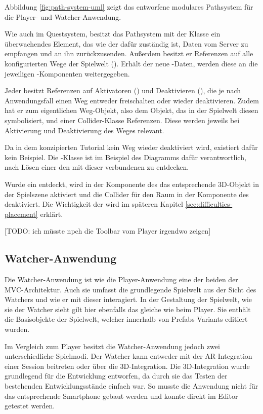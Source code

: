 Abbildung \ref{fig:path-system-uml} zeigt das entworfene modulares Pathsystem für die Player- und Watcher-Anwendung.

Wie auch im Questsystem, besitzt das Pathsystem mit der Klasse  ein überwachendes Element, das wie der  dafür zuständig ist, Daten vom Server zu empfangen und an ihn zurückzusenden. Außerdem besitzt er Referenzen auf alle konfigurierten Wege der Spielwelt (). Erhält der  neue -Daten, werden diese an die jeweiligen -Komponenten weitergegeben.

Jeder  besitzt Referenzen auf Aktivatoren () und Deaktivieren (), die je nach Anwendungsfall einen Weg entweder freischalten oder wieder deaktivieren. Zudem hat er zum eigentlichen Weg-Objekt, also dem Objekt, das in der Spielwelt diesen  symbolisiert, und einer Collider-Klasse Referenzen. Diese werden jeweils bei Aktivierung und Deaktivierung des Weges relevant.

Da in dem konzipierten Tutorial kein Weg wieder deaktiviert wird, existiert dafür kein Beispiel. Die -Klasse ist im Beispiel des Diagramms dafür verantwortlich, nach Lösen einer  den mit dieser  verbundenen  zu entdecken.

Wurde ein  entdeckt, wird in der Komponente des  das entsprechende \ac{3D}-Objekt in der Spielszene aktiviert und die Collider für den Raum in der Komponente des  deaktiviert. Die Wichtigkeit der  wird im späteren Kapitel \ref{sec:difficulties-placement} erklärt. 

[TODO: ich müsste npch die Toolbar vom Player irgendwo zeigen]

\subsection{Watcher-Anwendung}
Die Watcher-Anwendung ist wie die Player-Anwendung eine der beiden  der \ac{MVC}-Architektur. Auch sie umfasst die grundlegende Spielwelt aus der Sicht des Watchers und wie er mit dieser interagiert. In der Gestaltung der Spielwelt, wie sie der Watcher sieht gilt hier ebenfalls das gleiche wie beim Player. Sie enthält die Basisobjekte der Spielwelt, welcher innerhalb von Prefabs Variants editiert wurden.

Im Vergleich zum Player besitzt die Watcher-Anwendung jedoch zwei unterschiedliche Spielmodi. Der Watcher kann entweder mit der \ac{AR}-Integration einer Session beitreten oder über die \ac{3D}-Integration. Die \ac{3D}-Integration wurde grundlegend für die Entwicklung entworfen, da durch sie das Testen der bestehenden Entwicklungsstände einfach war. So musste die Anwendung nicht für das entsprechende Smartphone gebaut werden und konnte direkt im Editor getestet werden.

